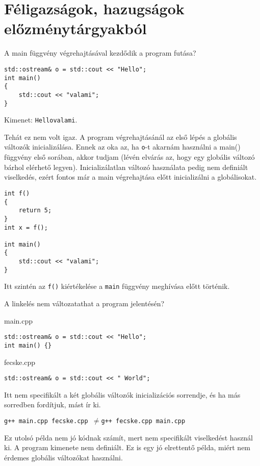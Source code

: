 \documentclass[a4paper,11.5pt]{article}
\begin{document}
	\section{Féligazságok, hazugságok előzménytárgyakból}
	\begin{example}
		A main függvény végrehajtásával kezdődik a program futása?
		\begin{lstlisting}
std::ostream& o = std::cout << "Hello";
int main()
{
	std::cout << "valami";
}
		\end{lstlisting}
		Kimenet: \texttt{Hellovalami}.
		
		Tehát ez nem volt igaz. A program végrehajtásánál az első lépés a globális változók inicializálása. Ennek az oka az, ha \texttt{o}-t akarnám használni a main() függvény első sorában, akkor tudjam (lévén elvárás az, hogy egy globális változó bárhol elérhető legyen). Inicializálatlan változó használata pedig nem definiált viselkedés, ezért fontos már a main végrehajtása előtt inicializálni a globálisokat.
		\begin{lstlisting}
int f()
{
	return 5;
}
int x = f();

int main()
{
	std::cout << "valami";
}
		\end{lstlisting}
    Itt szintén az \texttt{f()} kiértékelése a \texttt{main} függvény meghívása előtt történik.
	\end{example}
	\begin{example}
		A linkelés nem változatathat a program jelentésén?
		
		main.cpp
		\begin{lstlisting}
std::ostream& o = std::cout << "Hello";
int main() {}
		\end{lstlisting}
		fecske.cpp
		\begin{lstlisting}
std::ostream& o = std::cout << " World";
		\end{lstlisting}
		Itt nem specifikált a két globális változók inicializációs sorrendje, és ha más sorredben fordítjuk, mást ír ki.
		
		{\centering \texttt{g++ main.cpp fecske.cpp \quad $\not=$\quad g++ fecske.cpp main.cpp} \par}
	\end{example}
	\begin{note}
		Ez utolsó példa nem jó kódnak számít, mert nem specifikált viselkedést használ ki. A program kimenete nem definiált. Ez is egy jó elrettentő példa, miért nem érdemes globális változókat használni.
	\end{note}
\end{document}
